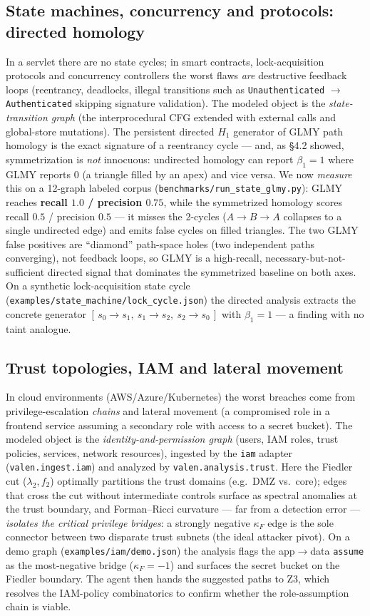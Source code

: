 \documentclass[11pt]{article}
\begin{document}
\subsection{State machines, concurrency and protocols: directed homology}
In a servlet there are no state cycles; in smart contracts, lock-acquisition
protocols and concurrency controllers the worst flaws \emph{are} destructive
feedback loops (reentrancy, deadlocks, illegal transitions such as
\texttt{Unauthenticated} $\to$ \texttt{Authenticated} skipping signature
validation). The modeled object is the \emph{state-transition graph} (the
interprocedural CFG extended with external calls and global-store mutations).
The persistent directed $H_1$ generator of GLMY path homology is the exact
signature of a reentrancy cycle --- and, as \S4.2 showed, symmetrization is
\emph{not} innocuous: undirected homology can report $\beta_1=1$ where GLMY
reports $0$ (a triangle filled by an apex) and vice versa. We now \emph{measure}
this on a 12-graph labeled corpus (\texttt{benchmarks/run\_state\_glmy.py}):
GLMY reaches \textbf{recall $1.0$ / precision $0.75$}, while the symmetrized
homology scores recall $0.5$ / precision $0.5$ --- it misses the 2-cycles
($A\to B\to A$ collapses to a single undirected edge) and emits false cycles on
filled triangles. The two GLMY false positives are ``diamond'' path-space holes
(two independent paths converging), not feedback loops, so GLMY is a
high-recall, necessary-but-not-sufficient directed signal that dominates the
symmetrized baseline on both axes. On a synthetic lock-acquisition state cycle
(\texttt{examples/state\_machine/lock\_cycle.json}) the directed analysis
extracts the concrete generator $[\,s_0\!\to\!s_1,\ s_1\!\to\!s_2,\
s_2\!\to\!s_0\,]$ with $\beta_1=1$ --- a finding with no taint analogue.

\subsection{Trust topologies, IAM and lateral movement}
In cloud environments (AWS/Azure/Kubernetes) the worst breaches come from
privilege-escalation \emph{chains} and lateral movement (a compromised role in a
frontend service assuming a secondary role with access to a secret bucket). The
modeled object is the \emph{identity-and-permission graph} (users, IAM roles,
trust policies, services, network resources), ingested by the \texttt{iam}
adapter (\texttt{valen.ingest.iam}) and analyzed by
\texttt{valen.analysis.trust}. Here the Fiedler cut
($\lambda_2, f_2$) optimally partitions the trust domains (e.g.\ DMZ vs.\ core);
edges that cross the cut without intermediate controls surface as spectral
anomalies at the trust boundary, and Forman--Ricci curvature --- far from a
detection error --- \emph{isolates the critical privilege bridges}: a strongly
negative $\kappa_F$ edge is the sole connector between two disparate trust
subnets (the ideal attacker pivot). On a demo graph
(\texttt{examples/iam/demo.json}) the analysis flags the app$\to$data
\texttt{assume} as the most-negative bridge ($\kappa_F=-1$) and surfaces the
secret bucket on the Fiedler boundary. The agent then hands the suggested paths
to Z3, which resolves the IAM-policy combinatorics to confirm whether the
role-assumption chain is viable.
\end{document}
